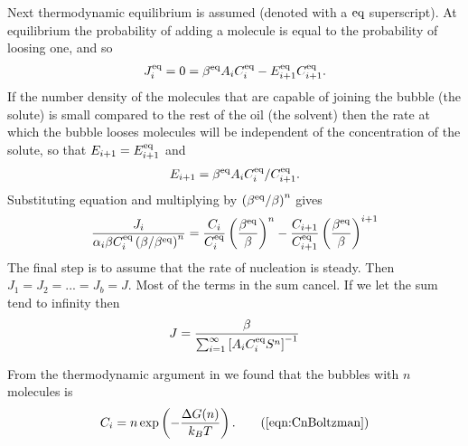 Next  thermodynamic equilibrium is assumed (denoted with a ${\text{eq}}$ superscript).
At equilibrium the probability of adding a molecule is equal to the probability of loosing one, 
and so 
\begin{align}
  J_i^{\text{eq}} = 0 =  \beta^{\text{eq}} A_i C_i^{\text{eq}} - E_{i+1}^{\text{eq}} C_{i+1}^{\text{eq}}.
\end{align}
If the number density of the molecules that are capable of joining the bubble  (the solute) is small compared to the rest of the oil (the solvent)
then the rate at which the bubble looses  molecules will be independent of the concentration of the solute, 
so that $E_{i+1} = E_{i+1}^{\text{eq}}$ and 
\begin{align}
  E_{i+1} =  \beta^{\text{eq}} A_i C_i^{\text{eq}}/C_{i+1}^{\text{eq}}. \label{eqn:Enpone}
\end{align}
Substituting  equation  and multiplying by $\left( \beta^{\text{eq}} / \beta \right)^n$ gives 
\begin{align}
  \frac{J_i} {\alpha_i \beta C_i^{\text{eq}}\left( \beta/\beta^{\text{eq}} \right)^n} 
= \frac{C_i}{C_i^{\text{eq}}}\left( \frac{\beta^{\text{eq}}}{\beta} \right)^n - \frac{C_{i+1}}{C_{i+1}^{\text{eq}}}\left( \frac{\beta^{\text{eq}}}{\beta} \right)^{i+1} \label{eqn:JnThree}
\end{align}
The final step is to assume that the rate of nucleation is steady.
Then $J_1 = J_2 = ... =  J_b = J$.
Most of the terms in the sum cancel.
If we let the sum tend to infinity then
\begin{align}
  J = \frac{\beta}{\sum_{i=1}^\infty\left[  A_i C_i^{\text{eq}} S^n \right]^{-1}} \label{eqn:rateOne}
\end{align}

From the thermodynamic argument in  we found that the bubbles with $n$ molecules is
\begin{align}
  C_i = n \exp \lr{- \frac{\Delta G(n)}{\kB T}}. \tag{\ref{eqn:CnBoltzman}}
\end{align}

